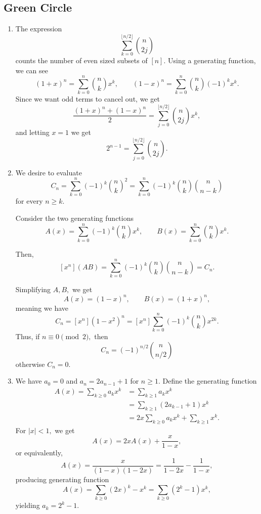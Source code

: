 \documentclass[12pt]{article}
\begin{document}
\subsection{Green Circle}
\begin{enumerate}
  \item [1] The expression
    $$
    \sum_{k = 0}^{\lfloor n/ 2\rfloor} {n \choose 2 j}
    $$
    counts the number of even sized subsets of $[n].$ Using a
    generating function, we can see
    $$
    (1+x)^n = \sum_{k = 0}^{n} {n \choose k} x^k, \qquad (1-x)^n
    =\sum_{k = 0}^{n} {n \choose k}(-1)^k x^k.
    $$
    Since we want odd terms to cancel out, we get
    $$
    \dfrac{(1+x)^n + (1-x)^n}{2} = \sum_{j = 0}^{\lfloor n/2 \rfloor
    }{n \choose 2j} x^k,
    $$
    and letting $x = 1$ we get
    $$
    2^{n-1} = \sum_{j = 0}^{\lfloor n /2 \rfloor} {n \choose 2j}.
    $$

  \item [3] We desire to evaluate
    $$
    C_n = \sum_{k = 0}^{n}(-1)^k{n \choose k}^2 = \sum_{k = 0}^{n}
    (-1)^k {n \choose k}{n \choose n - k }
    $$
    for every $n \geq k.$

    Consider the two generating functions
    $$
    A(x) = \sum_{k = 0}^{n} (-1)^k{n \choose k}x^k, \qquad B(x) =
    \sum_{k = 0}^{n} {n \choose k} x^k.
    $$

    Then, $$[x^{n}](AB) = \sum_{k = 0}^{n} (-1)^k {n \choose k}{n
    \choose n - k} = C_n.$$

    Simplifying $A, B,$ we get
    $$
    A(x) = (1-x)^n, \qquad B(x) = (1+x)^n,
    $$
    meaning we have
    $$
    C_n = [x^n] (1-x^2)^n = [x^n] \sum_{k = 0}^{n} (-1)^k {n \choose k} x^{2k}.
    $$
    Thus, if $n \equiv 0 \pmod 2,$ then
    $$
    C_n = (-1)^{n/2} {n \choose n/2}
    $$
    otherwise $C_n = 0.$

  \item [4] We have $a_0 = 0$ and $a_n = 2a_{n -1} + 1$ for $n \geq
    1.$ Define the generating function
    \begin{align*}
      A(x) = \sum_{k \geq 0} a_k x^k &= \sum_{k \geq 1} a_kx^k \\
      &= \sum_{k \geq 1} (2a_{k - 1} + 1)x^k \\
      &=2x\sum_{k \geq 0} a_{k} x^k + \sum_{k \geq 1} x^k.
    \end{align*}
    For $|x| < 1,$ we get
    $$
    A(x)  = 2xA(x) + \dfrac{x}{1-x},
    $$
    or equivalently,
    $$
    A(x) = \dfrac{x}{(1-x)(1-2x)} = \dfrac{1}{1-2x} - \dfrac{1}{1-x},
    $$
    producing generating function
    $$
    A(x) = \sum_{k \geq 0} (2x)^k - x^k = \sum_{k \geq 0}(2^k - 1) x^k,
    $$
    yielding $a_k = 2^k -1 .$
\end{enumerate}
\end{document}
